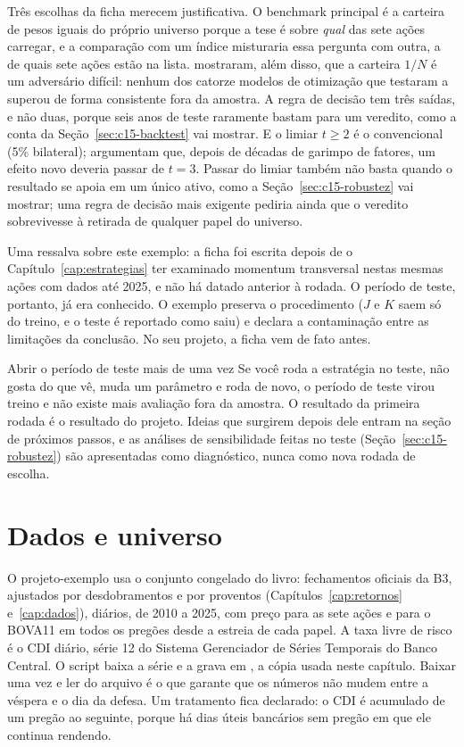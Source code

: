Três escolhas da ficha merecem justificativa. O benchmark principal é a carteira de pesos iguais do próprio universo porque a tese é sobre \emph{qual} das sete ações carregar, e a comparação com um índice misturaria essa pergunta com outra, a de quais sete ações estão na lista. \citet{demiguel2009} mostraram, além disso, que a carteira $1/N$ é um adversário difícil: nenhum dos catorze modelos de otimização que testaram a superou de forma consistente fora da amostra. A regra de decisão tem três saídas, e não duas, porque seis anos de teste raramente bastam para um veredito, como a conta da Seção~\ref{sec:c15-backtest} vai mostrar. E o limiar $t \ge 2$ é o convencional (5\% bilateral); \citet{harvey2016} argumentam que, depois de décadas de garimpo de fatores, um efeito novo deveria passar de $t = 3$. Passar do limiar também não basta quando o resultado se apoia em um único ativo, como a Seção~\ref{sec:c15-robustez} vai mostrar; uma regra de decisão mais exigente pediria ainda que o veredito sobrevivesse à retirada de qualquer papel do universo.

Uma ressalva sobre este exemplo: a ficha foi escrita depois de o Capítulo~\ref{cap:estrategias} ter examinado momentum transversal nestas mesmas ações com dados até 2025, e não há  datado anterior à rodada. O período de teste, portanto, já era conhecido. O exemplo preserva o procedimento ($J$ e $K$ saem só do treino, e o teste é reportado como saiu) e declara a contaminação entre as limitações da conclusão. No seu projeto, a ficha vem de fato antes.

\begin{armadilha}{Abrir o período de teste mais de uma vez}
Se você roda a estratégia no teste, não gosta do que vê, muda um parâmetro e roda de novo, o período de teste virou treino e não existe mais avaliação fora da amostra. O resultado da primeira rodada é o resultado do projeto. Ideias que surgirem depois dele entram na seção de próximos passos, e as análises de sensibilidade feitas no teste (Seção~\ref{sec:c15-robustez}) são apresentadas como diagnóstico, nunca como nova rodada de escolha.
\end{armadilha}

\section{Dados e universo}
\label{sec:c15-dados}

O projeto-exemplo usa o conjunto congelado do livro: fechamentos oficiais da B3, ajustados por desdobramentos e por proventos (Capítulos~\ref{cap:retornos} e~\ref{cap:dados}), diários, de 2010 a 2025, com preço para as sete ações e para o BOVA11 em todos os pregões desde a estreia de cada papel. A taxa livre de risco é o CDI diário, série 12 do Sistema Gerenciador de Séries Temporais do Banco Central. O script  baixa a série e a grava em , a cópia usada neste capítulo. Baixar uma vez e ler do arquivo é o que garante que os números não mudem entre a véspera e o dia da defesa. Um tratamento fica declarado: o CDI é acumulado de um pregão ao seguinte, porque há dias úteis bancários sem pregão em que ele continua rendendo.

